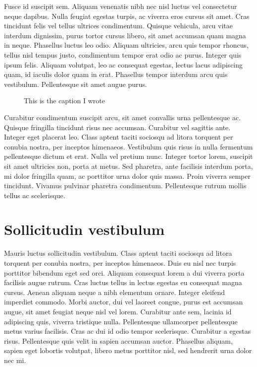 Fusce id suscipit sem. Aliquam venenatis nibh nec nisl luctus vel consectetur neque dapibus. Nulla feugiat egestas turpis, ac viverra eros cursus sit amet. Cras tincidunt felis vel tellus ultrices condimentum. Quisque vehicula, arcu vitae interdum dignissim, purus tortor cursus libero, sit amet accumsan quam magna in neque. Phasellus luctus leo odio. Aliquam ultricies, arcu quis tempor rhoncus, tellus nisl tempus justo, condimentum tempor erat odio ac purus. Integer quis ipsum felis. Aliquam volutpat, leo ac consequat egestas, lectus lacus adipiscing quam, id iaculis dolor quam in erat. Phasellus tempor interdum arcu quis vestibulum. Pellentesque sit amet augue purus. 
\begin{figure}[htbp]
    \centering
    \caption{This is the caption I wrote}
    \label{fig:label}
\end{figure}
Curabitur condimentum suscipit arcu, sit amet convallis urna pellentesque ac. Quisque fringilla tincidunt risus nec accumsan. Curabitur vel sagittis ante. Integer eget placerat leo. Class aptent taciti sociosqu ad litora torquent per conubia nostra, per inceptos himenaeos. Vestibulum quis risus in nulla fermentum pellentesque dictum et erat. Nulla vel pretium nunc. Integer tortor lorem, suscipit sit amet ultricies non, porta at metus. Sed pharetra, ante facilisis interdum porta, mi dolor fringilla quam, ac porttitor urna dolor quis massa. Proin viverra semper tincidunt. Vivamus pulvinar pharetra condimentum. Pellentesque rutrum mollis tellus ac scelerisque.

\section{Sollicitudin vestibulum}
Mauris luctus sollicitudin vestibulum. Class aptent taciti sociosqu ad litora torquent per conubia nostra, per inceptos himenaeos. Duis eu nisl nec turpis porttitor bibendum eget sed orci. Aliquam consequat lorem a dui viverra porta facilisis augue rutrum. Cras luctus tellus in lectus egestas eu consequat magna cursus. Aenean aliquam neque a nibh elementum ornare. Integer eleifend imperdiet commodo. Morbi auctor, dui vel laoreet congue, purus est accumsan augue, sit amet feugiat neque nisl vel lorem. Curabitur ante sem, lacinia id adipiscing quis, viverra tristique nulla. Pellentesque ullamcorper pellentesque metus varius facilisis. Cras ac dui id odio tempor scelerisque. Curabitur a egestas risus. Pellentesque quis velit in sapien accumsan auctor. Phasellus aliquam, sapien eget lobortis volutpat, libero metus porttitor nisl, sed hendrerit urna dolor nec mi.


